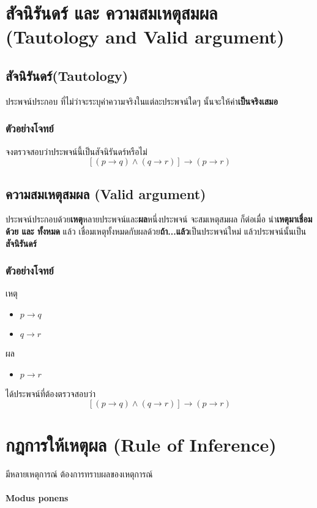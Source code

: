 \documentclass[12pt,a4paper]{article}
\begin{document}
\section*{สัจนิรันดร์ และ ความสมเหตุสมผล (Tautology and Valid argument)}
\subsection*{สัจนิรันดร์(Tautology)}
\quad ประพจน์ประกอบ ที่ไม่ว่าจะระบุค่าความจริงในแต่ละประพจน์ใดๆ นั้นจะให้ค่า\textbf{เป็นจริงเสมอ}
\subsubsection*{ตัวอย่างโจทย์}
จงตรวจสอบว่าประพจน์นี้เป็นสัจนิรันดร์หรือไม่
$$
    \left[ (p \rightarrow q) \land (q \rightarrow r) \right] \rightarrow (p \rightarrow r)
$$
\rule{0pt}{35ex}
\subsection*{ความสมเหตุสมผล (Valid argument)}
\quad ประพจน์ประกอบด้วย\textbf{เหตุ}หลายประพจน์และ\textbf{ผล}หนึ่งประพจน์ จะสมเหตุสมผล ก็ต่อเมื่อ นำ\textbf{เหตุมาเชื่อมด้วย และ ทั้งหมด} แล้ว เชื่อมเหตุทั้งหมดกับผลด้วย\textbf{ถ้า...แล้ว}เป็นประพจน์ใหม่ แล้วประพจน์นั้นเป็น \textbf{สัจนิรันดร์}

\subsubsection*{ตัวอย่างโจทย์}
เหตุ
\begin{itemize}
    \item $p \rightarrow q$
    \item $q \rightarrow r$
\end{itemize}
ผล
\begin{itemize}
    \item $p \rightarrow r$
\end{itemize}
ได้ประพจน์ที่ต้องตรวจสอบว่า
$$
    \left[ (p \rightarrow q) \land (q \rightarrow r) \right] \rightarrow (p \rightarrow r)
$$
\hrulefill

\newpage
\section*{กฎการให้เหตุผล (Rule of Inference)}
มีหลายเหตุการณ์ ต้องการทราบผลของเหตุการณ์

\paragraph{Modus ponens}
\end{document}
